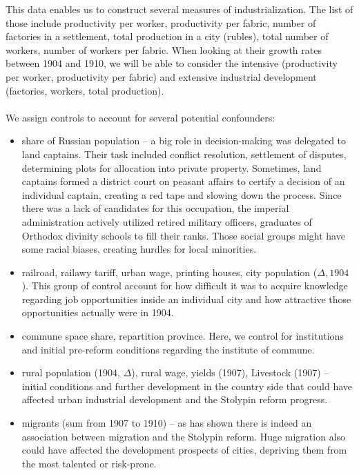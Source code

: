 \documentclass[a4paper, 12pt]{article}
\begin{document}
\noindent This data enables us to construct several measures of industrialization. The list of those include productivity per worker, productivity per fabric, number of factories in a settlement, total production in a city (rubles), total number of workers, number of workers per fabric. When looking at their growth rates between 1904 and 1910, we will be able to consider the intensive (productivity per worker, productivity per fabric) and extensive industrial development (factories, workers, total production).
\\\\
\noindent We assign controls to account  for several potential confounders:

\begin{itemize}
    \item share of Russian population -- a big role in decision-making was delegated to land captains. Their task included conflict resolution, settlement of disputes, determining plots for allocation into private property. Sometimes, land captains formed a district court on peasant affairs to certify a decision of an individual captain, creating a red tape and slowing down the process. Since there was a lack of candidates for this occupation, the imperial administration actively utilized retired military officers, graduates of Orthodox divinity schools to fill their ranks. Those social groups might have some racial biases, creating hurdles for local minorities. 
    
    \item  railroad, railawy tariff, urban wage, printing houses, city population ($\Delta, 1904$). This group of control account for how difficult it was to  acquire knowledge regarding job opportunities inside an individual city and how attractive those opportunities actually were in 1904.
    
    \item commune space share, repartition province. Here, we control for institutions and initial pre-reform conditions regarding the institute of commune. 
    
    \item rural population (1904, $\Delta$), rural wage, yields (1907), Livestock (1907) -- initial conditions and further development in the country side that could have affected urban industrial development and the Stolypin reform progress.
    
    \item migrants (sum from 1907 to 1910) -- as \cite{chernina2014property} has shown there is indeed an association between migration and the Stolypin reform. Huge migration also could have affected the development prospects of cities, depriving them from the most talented or risk-prone. 
\end{itemize}
\end{document}
